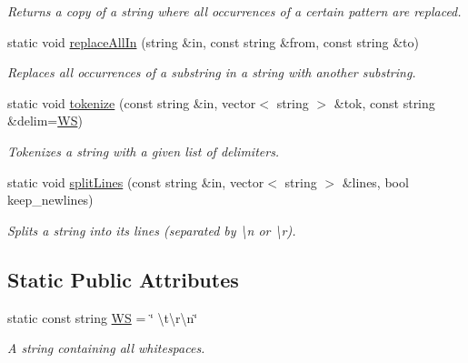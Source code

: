 \begin{DoxyCompactItemize}
\begin{DoxyCompactList}\small\item\em Returns a copy of a string where all occurrences of a certain pattern are replaced. \end{DoxyCompactList}\item 
static void \hyperlink{classStringUtils_aa271d595f98f7cd479358b30787aa1cf}{replace\-All\-In} (string \&in, const string \&from, const string \&to)
\begin{DoxyCompactList}\small\item\em Replaces all occurrences of a substring in a string with another substring. \end{DoxyCompactList}\item 
static void \hyperlink{classStringUtils_a5460a1950dad8272b36ba35a2435f0a1}{tokenize} (const string \&in, vector$<$ string $>$ \&tok, const string \&delim=\hyperlink{classStringUtils_a2abc03ce0e461cb7efca2166a12fd496}{W\-S})
\begin{DoxyCompactList}\small\item\em Tokenizes a string with a given list of delimiters. \end{DoxyCompactList}\item 
static void \hyperlink{classStringUtils_a42d256dd2f9c9a717c18c01c0e15a8a6}{split\-Lines} (const string \&in, vector$<$ string $>$ \&lines, bool keep\-\_\-newlines)
\begin{DoxyCompactList}\small\item\em Splits a string into its lines (separated by \textbackslash{}n or \textbackslash{}r). \end{DoxyCompactList}\end{DoxyCompactItemize}
\subsection*{Static Public Attributes}
\begin{DoxyCompactItemize}
\item 
static const string \hyperlink{classStringUtils_a2abc03ce0e461cb7efca2166a12fd496}{W\-S} = \char`\"{} \textbackslash{}t\textbackslash{}r\textbackslash{}n\char`\"{}
\begin{DoxyCompactList}\small\item\em A string containing all whitespaces. \end{DoxyCompactList}\end{DoxyCompactItemize}
